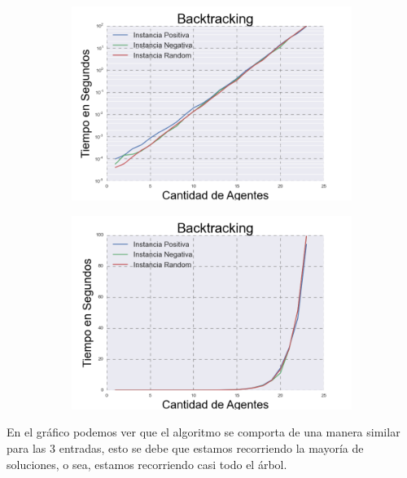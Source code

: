 \begin{figure}[h]
\begin{subfigure}{0.5\textwidth}
\includegraphics[scale=0.45]{BacktrackingLog.png}
\end{subfigure}
\begin{subfigure}{0.5\textwidth}
\includegraphics[scale=0.45]{Backtracking.png}
\end{subfigure}
\end{figure}

	En el gráfico podemos ver que el algoritmo se comporta de una manera similar para las 3 entradas, esto se debe que estamos recorriendo la mayoría de soluciones, o sea, estamos recorriendo casi todo el árbol. 
	



